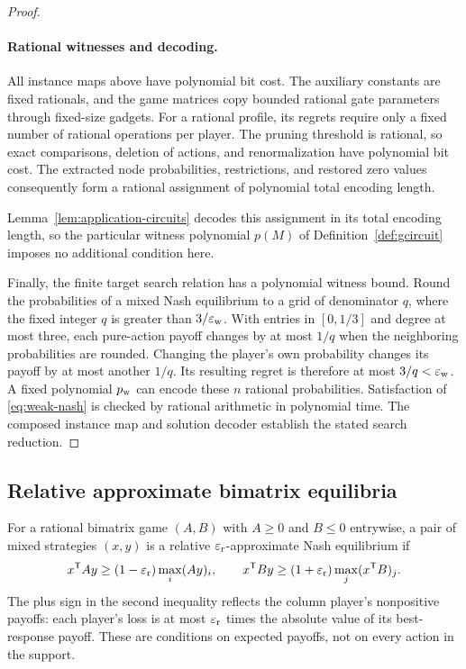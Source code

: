 \begin{proof}
\paragraph{Rational witnesses and decoding.}
All instance maps above have polynomial bit cost. The auxiliary
constants are fixed rationals, and the game matrices copy bounded
rational gate parameters through fixed-size gadgets. For a rational
profile, its regrets require only a fixed number of rational operations
per player. The pruning threshold is rational, so exact comparisons,
deletion of actions, and renormalization have polynomial bit cost.
The extracted node probabilities, restrictions, and restored zero
values consequently form a rational assignment of polynomial total
encoding length.

Lemma~\ref{lem:application-circuits} decodes this assignment in its
total encoding length, so the particular witness polynomial $p(M)$ of
Definition~\ref{def:gcircuit} imposes no additional condition here.

Finally, the finite target search relation has a polynomial witness
bound. Round the probabilities of a mixed Nash equilibrium to a grid
of denominator $q$, where the fixed integer $q$ is greater than
$3/\varepsilon_{\rm w}$. With entries in $[0,1/3]$ and degree at most three,
each pure-action payoff changes by at most $1/q$ when the neighboring
probabilities are rounded. Changing the player's own probability
changes its payoff by at most another $1/q$. Its resulting regret is
therefore at most $3/q<\varepsilon_{\rm w}$. A fixed polynomial $p_{\rm w}$
can encode these $n$ rational probabilities. Satisfaction of
\eqref{eq:weak-nash} is checked by rational arithmetic in polynomial
time. The composed instance map and solution decoder establish the
stated search reduction.
\end{proof}


\subsection{Relative approximate bimatrix equilibria}

For a rational bimatrix game $(A,B)$ with $A\geq0$ and $B\leq0$
entrywise, a pair of mixed strategies $(x,y)$ is a relative
$\varepsilon_{\rm r}$-approximate Nash equilibrium if
\begin{equation}\label{eq:relative-nash}
 x^{\mathsf T}Ay\geq(1-\varepsilon_{\rm r})\max_i(Ay)_i,
 \qquad
 x^{\mathsf T}By\geq(1+\varepsilon_{\rm r})\max_j(x^{\mathsf T}B)_j.
\end{equation}
The plus sign in the second inequality reflects the column player's
nonpositive payoffs: each player's loss is at most $\varepsilon_{\rm r}$
times the absolute value of its best-response payoff. These are
conditions on expected payoffs, not on every action in the support.

